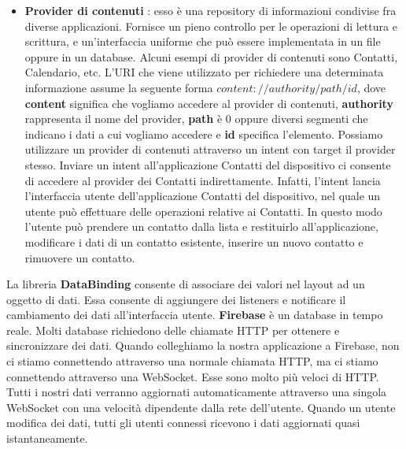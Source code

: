 \documentclass[12pt]{report}
\begin{document}
\begin{itemize}
\item \textbf{Provider di contenuti} : esso è una repository di informazioni condivise fra diverse applicazioni. Fornisce un pieno controllo per le operazioni di lettura e scrittura, e un'interfaccia uniforme che può essere implementata in un file oppure in un database. Alcuni esempi di provider di contenuti sono Contatti, Calendario, etc. L'URI che viene utilizzato per richiedere una determinata informazione assume la seguente forma $content://authority/path/id$, dove \textbf{content} significa che vogliamo accedere al provider di contenuti, \textbf{authority} rappresenta il nome del provider, \textbf{path} è 0 oppure diversi segmenti che indicano i dati a cui vogliamo accedere e \textbf{id} specifica l'elemento. Possiamo utilizzare un provider di contenuti attraverso un intent con target il provider stesso. Inviare un intent all'applicazione Contatti del dispositivo ci consente di accedere al provider dei Contatti indirettamente. Infatti, l'intent lancia l'interfaccia utente dell'applicazione Contatti del dispositivo, nel quale un utente può effettuare delle operazioni relative ai Contatti. In questo modo l'utente può prendere un contatto dalla lista e restituirlo all'applicazione, modificare i dati di un contatto esistente, inserire un nuovo contatto e rimuovere un contatto.
\end{itemize}
La libreria \textbf{DataBinding} consente di associare dei valori nel layout ad un oggetto di dati. Essa consente di aggiungere dei listeners e notificare il cambiamento dei dati all'interfaccia utente. \textbf{Firebase} è un database in tempo reale. Molti database richiedono delle chiamate HTTP per ottenere e sincronizzare dei dati. Quando colleghiamo la nostra applicazione a Firebase, non ci stiamo connettendo attraverso una normale chiamata HTTP, ma ci stiamo connettendo attraverso una WebSocket. Esse sono molto più veloci di HTTP. Tutti i nostri dati verranno aggiornati automaticamente attraverso una singola WebSocket con una velocità dipendente dalla rete dell'utente. Quando un utente modifica dei dati, tutti gli utenti connessi ricevono i dati aggiornati quasi istantaneamente.
\end{document}
